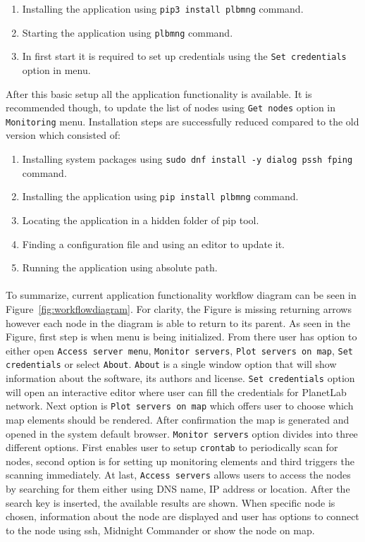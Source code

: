 {{{{{{{\begin{enumerate}
	\item Installing the application using \texttt{pip3 install plbmng} command.
	\item Starting the application using \texttt{plbmng} command.
	\item In first start it is required to set up credentials using the \texttt{Set credentials} option in menu.
\end{enumerate}

After this basic setup all the application functionality is available. It is recommended though, to update the list of nodes using \texttt{Get nodes} option in \texttt{Monitoring} menu. Installation steps are successfully reduced compared to the old version which consisted of:

\begin{enumerate}
	\item Installing system packages using \texttt{sudo dnf install -y dialog pssh fping} command.
	\item Installing the application using \texttt{pip install plbmng} command.
	\item Locating the application in a hidden folder of pip tool.
	\item Finding a configuration file and using an editor to update it.
	\item Running the application using absolute path.
\end{enumerate}

\paragraph{} To summarize, current application functionality workflow diagram can be seen in Figure~\ref{fig:workflowdiagram}. For clarity, the Figure is missing returning arrows however each node in the diagram is able to return to its parent. As seen in the Figure, first step is when menu is being initialized. From there user has option to either open \texttt{Access server menu}, \texttt{Monitor servers}, \texttt{Plot servers on map}, \texttt{Set credentials} or select \texttt{About}. \texttt{About} is a single window option that will show information about the software, its authors and license. \texttt{Set credentials} option will open an interactive editor where user can fill the credentials for PlanetLab network. Next option is \texttt{Plot servers on map} which offers user to choose which map elements should be rendered. After confirmation the map is generated and opened in the system default browser. \texttt{Monitor servers} option divides into three different options. First enables user to setup \texttt{crontab} to periodically scan for nodes, second option is for setting up monitoring elements and third triggers the scanning immediately. At last, \texttt{Access servers} allows users to access the nodes by searching for them either using DNS name, IP address or location. After the search key is inserted, the available results are shown. When specific node is chosen, information about the node are displayed and user has options to connect to the node using ssh, Midnight Commander or show the node on map.

}}}}}}}
